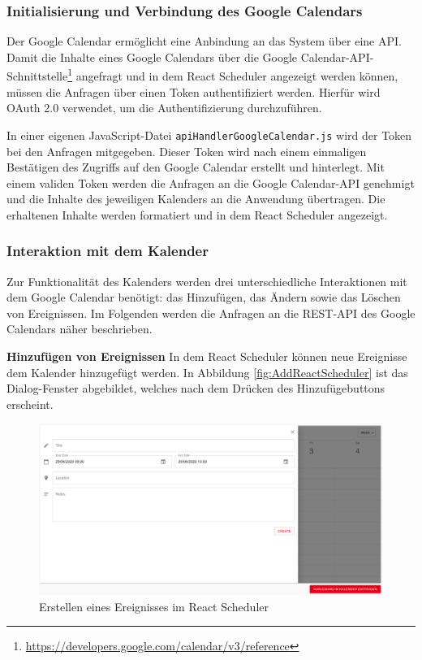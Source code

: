 \subsubsection{Initialisierung und Verbindung des Google Calendars}
Der Google Calendar ermöglicht eine Anbindung an das System über eine \ac{API}.
Damit die Inhalte eines Google Calendars über die Google Calendar-\ac{API}-Schnittstelle\footnote{\url{https://developers.google.com/calendar/v3/reference}} angefragt und in dem React Scheduler angezeigt werden können, müssen die Anfragen über einen Token authentifiziert werden. 
Hierfür wird OAuth 2.0 verwendet, um die Authentifizierung durchzuführen.\autocite[Vgl.][]{GCApi} 

In einer eigenen JavaScript-Datei \texttt{apiHandlerGoogleCalendar.js} wird der Token bei den Anfragen mitgegeben. Dieser Token wird nach einem einmaligen Bestätigen des Zugriffs auf den Google Calendar erstellt und hinterlegt. 
Mit einem validen Token werden die Anfragen an die Google Calendar-\ac{API} genehmigt und die Inhalte des jeweiligen Kalenders an die Anwendung übertragen. Die erhaltenen Inhalte werden formatiert und in dem React Scheduler angezeigt.


\subsubsection{Interaktion mit dem Kalender}\label{ch:InteraktionGC}
Zur Funktionalität des Kalenders werden drei unterschiedliche Interaktionen mit dem Google Calendar benötigt: das Hinzufügen, das Ändern sowie das Löschen von Ereignissen. Im Folgenden werden die Anfragen an die \ac{REST}-\ac{API} des Google Calendars näher beschrieben.

\textbf{Hinzufügen von Ereignissen}\newline
In dem React Scheduler können neue Ereignisse dem Kalender hinzugefügt werden.
In Abbildung \vref{fig:AddReactScheduler} ist das Dialog-Fenster abgebildet, welches nach dem Drücken des Hinzufügebuttons erscheint.
\begin{figure}[H]
	\centering 
	\includegraphics[width=\textwidth]{img/FrontEnd/GCAdd.png}
	\caption[Erstellen eines Ereignisses im React Scheduler]{\label{fig:AddReactScheduler}Erstellen eines Ereignisses im React Scheduler}
\end{figure}

